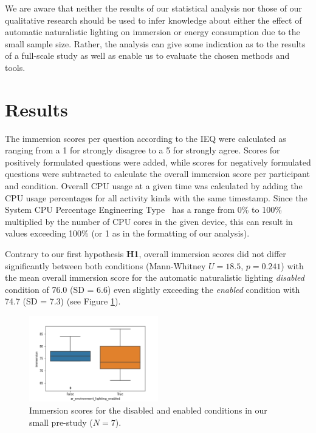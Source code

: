 \documentclass[12pt,twoside,english]{article}
\begin{document}
We are aware that neither the results of our statistical analysis nor those of our qualitative research should be used to infer knowledge about either the effect of automatic naturalistic lighting on immersion or energy consumption due to the small sample size.
Rather, the analysis can give some indication as to the results of a full-scale study as well as enable us to evaluate the chosen methods and tools.

\section{Results}
\label{sect:results}

The immersion scores per question according to the \gls{IEQ} were calculated as ranging from a 1 for strongly disagree to a 5 for strongly agree.
Scores for positively formulated questions were added, while scores for negatively formulated questions were subtracted to calculate the overall immersion score per participant and condition.
Overall \gls{CPU} usage at a given time was calculated by adding the \gls{CPU} usage percentages for all activity kinds with the same timestamp.
Since the System CPU Percentage Engineering Type~\cite{apple_system_2020} has a range from 0\% to 100\% multiplied by the number of \gls{CPU} cores in the given device, this can result in values exceeding 100\% (or 1 as in the formatting of our analysis).

Contrary to our first hypothesis \textbf{H1}, overall immersion scores did not differ significantly between both conditions (Mann-Whitney $ U = 18.5 $, $ p = 0.241 $) with the mean overall immersion score for the automatic naturalistic lighting \textit{disabled} condition of 76.0 (SD = 6.6) even slightly exceeding the \textit{enabled} condition with 74.7 (SD = 7.3) (see Figure \ref{fig:immersion_plot}).

\begin{figure}[h]
    \centering
    \includegraphics[width=0.5\textwidth]{imgs/immersion_plot}
    \caption{Immersion scores for the disabled and enabled conditions in our small pre-study ($ N = 7 $).}
    \label{fig:immersion_plot}
\end{figure}
\end{document}
